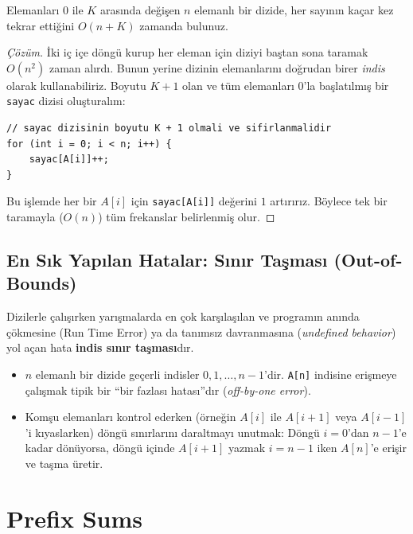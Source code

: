 \begin{example}
Elemanları $0$ ile $K$ arasında değişen $n$ elemanlı bir dizide, her sayının kaçar kez tekrar ettiğini $O(n + K)$ zamanda bulunuz.
\end{example}

\begin{proof}[Çözüm]
İki iç içe döngü kurup her eleman için diziyi baştan sona taramak $O(n^2)$ zaman alırdı. Bunun yerine dizinin elemanlarını doğrudan birer \emph{indis} olarak kullanabiliriz. Boyutu $K+1$ olan ve tüm elemanları $0$'la başlatılmış bir \texttt{sayac} dizisi oluşturalım:

\begin{lstlisting}[language=CTemel]
// sayac dizisinin boyutu K + 1 olmali ve sifirlanmalidir
for (int i = 0; i < n; i++) {
    sayac[A[i]]++;
}
\end{lstlisting}
Bu işlemde her bir $A[i]$ için \texttt{sayac[A[i]]} değerini $1$ artırırız. Böylece tek bir taramayla ($O(n)$) tüm frekanslar belirlenmiş olur.
\end{proof}

\subsection*{En Sık Yapılan Hatalar: Sınır Taşması (Out-of-Bounds)}
Dizilerle çalışırken yarışmalarda en çok karşılaşılan ve programın anında çökmesine (Run Time Error) ya da tanımsız davranmasına (\emph{undefined behavior}) yol açan hata \textbf{indis sınır taşması}dır.
\begin{itemize}
    \item $n$ elemanlı bir dizide geçerli indisler $0, 1, \dots, n-1$'dir. \texttt{A[n]} indisine erişmeye çalışmak tipik bir ``bir fazlası hatası''dır (\emph{off-by-one error}).
    \item Komşu elemanları kontrol ederken (örneğin $A[i]$ ile $A[i+1]$ veya $A[i-1]$'i kıyaslarken) döngü sınırlarını daraltmayı unutmak: Döngü $i = 0$'dan $n-1$'e kadar dönüyorsa, döngü içinde $A[i+1]$ yazmak $i = n-1$ iken $A[n]$'e erişir ve taşma üretir.
\end{itemize}

\section{Prefix Sums}

